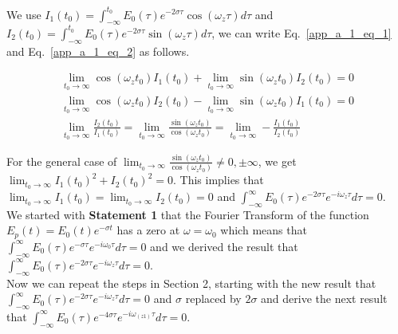 \documentclass[11pt]{elsarticle}
\begin{document}
We use $I_1(t_0) =  \int_{-\infty}^{t_0}     E_{0}( \tau)  e^{ -2 \sigma \tau}  \cos{ (\omega_z \tau)} d\tau$ and $I_2(t_0) =  \int_{-\infty}^{t_0}  E_{0}( \tau)  e^{ -2 \sigma \tau}  \sin{ (\omega_z \tau)} d\tau$,  we can write Eq.~\ref{app_a_1_eq_1} and Eq.~\ref{app_a_1_eq_2} as follows. 


\begin{eqnarray*}\label{app_a_1_eq_3}   
\lim_{t_0 \to \infty}  \cos{ ( \omega_z t_0)}  I_1(t_0) + \lim_{t_0 \to \infty}  \sin{ ( \omega_z t_0)}  I_2(t_0) = 0 \\
\lim_{t_0 \to \infty}  \cos{ ( \omega_z t_0)}  I_2(t_0) - \lim_{t_0 \to \infty}  \sin{ ( \omega_z t_0)}  I_1(t_0)  = 0 \\
\lim_{t_0 \to \infty} \frac{I_2(t_0)}{I_1(t_0)} = \lim_{t_0 \to \infty} \frac{ \sin{ ( \omega_z t_0)}}{ \cos{ ( \omega_z t_0)}} = \lim_{t_0 \to \infty} -\frac{I_1(t_0)}{I_2(t_0)} 
\end{eqnarray*}
\begin{equation} \end{equation}  

For the general case of $\lim_{t_0 \to \infty} \frac{ \sin{ ( \omega_z t_0)}}{ \cos{ ( \omega_z t_0)}} \neq 0, \pm \infty$, we get $\lim_{t_0 \to \infty} I_1(t_0)^{2} + I_2(t_0)^{2} = 0$. This implies that $\lim_{t_0 \to \infty} I_1(t_0)= \lim_{t_0 \to \infty}I_2(t_0) = 0$ and $\int_{-\infty}^{\infty}     E_0(\tau) e^{-2 \sigma \tau} e^{-i  \omega_z \tau} d\tau = 0$. \\

We started with \textbf{Statement 1} that the Fourier Transform of the function $E_p(t) = E_0(t) e^{-\sigma t} $ has a zero at $\omega = \omega_{0}$ which means that $\int_{-\infty}^{\infty}    E_0(\tau) e^{- \sigma \tau} e^{-i \omega_0 \tau} d\tau = 0$ and we derived the result that $\int_{-\infty}^{\infty}    E_0(\tau) e^{-2 \sigma \tau} e^{-i  \omega_z \tau} d\tau = 0$.\\

Now we can repeat the steps in Section 2, starting with the new result that $\int_{-\infty}^{\infty}    E_0(\tau) e^{-2 \sigma \tau} e^{-i \omega_z \tau} d\tau = 0$ and $\sigma$ replaced by $2 \sigma$ and derive the next result that $\int_{-\infty}^{\infty}    E_0(\tau) e^{-4 \sigma \tau} e^{-i \omega_{(z1)} \tau} d\tau = 0$.\\
\end{document}
